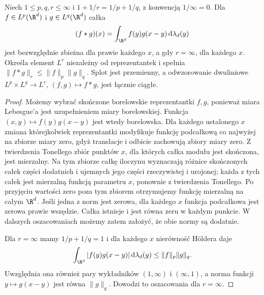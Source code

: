 \begin{twierdzenie}
\label{thm:dt-young-general}
Niech $1\le p,q,r\le\infty$ i
$1+1/r=1/p+1/q$, z konwencją $1/\infty=0$.
Dla $f\in L^p(\R^d)$ i $g\in L^q(\R^d)$ całka
\[
 (f*g)(x)=\int_{\R^d}f(y)g(x-y)\,\mathrm d\lambda_d(y)
\]
jest bezwzględnie zbieżna dla prawie każdego $x$,
a gdy $r=\infty$, dla każdego $x$. Określa element
$L^r$ niezależny od reprezentantek i spełnia
$\|f*g\|_r\le\|f\|_p\|g\|_q$.
Splot jest przemienny, a odwzorowanie dwuliniowe
$L^p\times L^q\to L^r$, $(f,g)\mapsto f*g$,
jest łącznie ciągłe.
\end{twierdzenie}
\begin{proof}
Możemy wybrać skończone borelowskie reprezentantki
$f,g$, ponieważ miara Lebesgue'a jest uzupełnieniem
miary borelowskiej. Funkcja
$(x,y)\mapsto f(y)g(x-y)$ jest wtedy borelowska. Dla każdego ustalonego $x$ zmiana którejkolwiek
reprezentantki modyfikuje funkcję podcałkową co najwyżej
na zbiorze miary zero, gdyż translacje i odbicie zachowują
zbiory miary zero. Z twierdzenia Tonellego zbiór punktów $x$, dla których
całka modułu jest skończona, jest mierzalny. Na tym
zbiorze całkę iloczynu wyznaczają różnice skończonych
całek części dodatnich i ujemnych jego części rzeczywistej
i urojonej; każda z tych całek jest mierzalną funkcją
parametru $x$, ponownie z twierdzenia Tonellego.
Po przyjęciu wartości zero poza tym zbiorem otrzymujemy
funkcję mierzalną na całym $\R^d$.
Jeśli jedna z norm jest zerowa, dla każdego $x$
funkcja podcałkowa jest zerowa prawie wszędzie.
Całka istnieje i jest równa zeru w każdym punkcie.
W dalszych oszacowaniach możemy zatem założyć,
że obie normy są dodatnie.

Dla $r=\infty$ mamy $1/p+1/q=1$ i dla każdego $x$
nierówność Höldera daje
\[
 \int_{\R^d}|f(y)g(x-y)|\,\mathrm d\lambda_d(y)
 \le\|f\|_p\|g\|_q.
\]
Uwzględnia ona również pary wykładników $(1,\infty)$
i $(\infty,1)$, a norma funkcji $y\mapsto g(x-y)$
jest równa $\|g\|_q$. Dowodzi to oszacowania dla $r=\infty$.


\end{proof}
